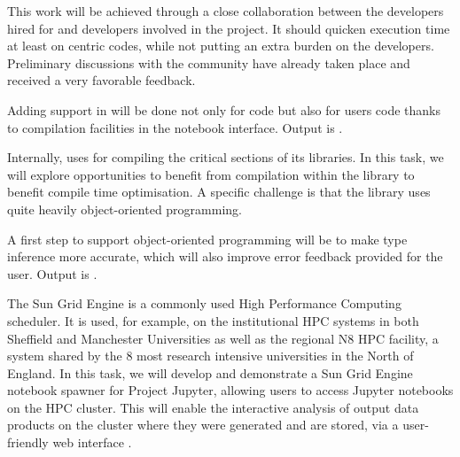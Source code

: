 \begin{workpackage}
\begin{tasklist}
\begin{task}[title=Pythran,id=pythran,lead=LL,partners={UJF},PM=24, wphases=0-24]
  This work will be achieved through a close collaboration between the \Pythran
  developers hired for \TheProject and \Cython developers involved in the \Sage
  project. It should quicken \Sage execution time at least on \Numpy centric
  codes, while not putting an extra burden on the developers.  Preliminary
  discussions with the \Cython community have already taken place and received a
  very favorable feedback.

  Adding \Pythran support in \Sage will be done not only for \Sage code but also
  for \Sage users code thanks to compilation facilities in the notebook interface.
  Output is .


  Internally, \Sage uses \Cython for compiling the critical sections of
  its libraries. In this task, we will explore opportunities to
  benefit from \Pythran compilation within the \Sage library to benefit
  \Pythran compile time optimisation. A specific challenge is that the \Sage
  library uses quite heavily object-oriented programming.

  A first step to support object-oriented programming will be to make
  \Pythran type inference more accurate, which will also improve error
  feedback provided for the user. Output is .
\end{task}

\begin{task}[title=Sun Grid Engine Integration in Project Jupyter Hub, lead=USH,id=hpc-jupyter,PM=12,wphases=0-12]
The Sun Grid Engine is a commonly used High Performance Computing
scheduler. It is used, for example, on the institutional HPC systems
in both Sheffield and Manchester Universities as well as the regional
N8 HPC facility, a system shared by the 8 most research intensive
universities in the North of England. In this task, we will develop
and demonstrate a Sun Grid Engine notebook spawner for Project
Jupyter, allowing users to access Jupyter notebooks on the HPC
cluster. This will enable the interactive analysis of output data
products on the cluster where they were generated and are stored, via
a user-friendly web interface .
\end{task}
\end{tasklist}


\end{workpackage}

